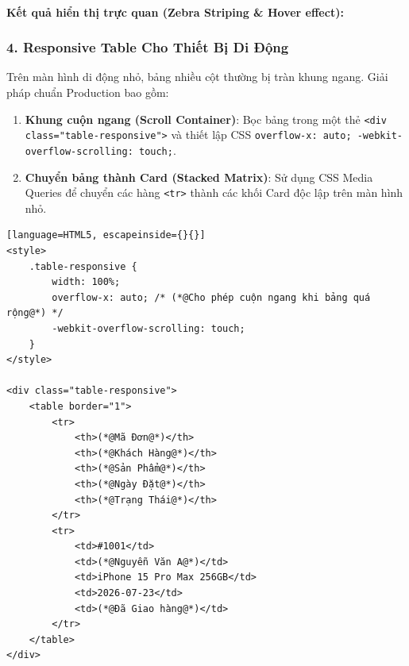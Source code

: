 \documentclass[11pt,oneside]{book}
\newcommand{\thd}[1]{\textcolor{white}{\textbf{\strut #1}}}
\newcommand{\codeinline}[1]{\textcolor{accentOrange}{\texttt{#1}}}
\begin{document}
\paragraph{\textbf{Kết quả hiển thị trực quan (Zebra Striping \& Hover effect):}}
\begin{prettyTableBox}
\end{prettyTableBox}

\subsubsection{4. Responsive Table Cho Thiết Bị Di Động}

Trên màn hình di động nhỏ, bảng nhiều cột thường bị tràn khung ngang. Giải pháp chuẩn Production bao gồm:

\begin{enumerate}[leftmargin=1.5em, itemsep=3pt, parsep=0pt]
    \item \textbf{Khung cuộn ngang (Scroll Container)}: Bọc bảng trong một thẻ \codeinline{<div class="table-responsive">} và thiết lập CSS \codeinline{overflow-x: auto; -webkit-overflow-scrolling: touch;}.
    \item \textbf{Chuyển bảng thành Card (Stacked Matrix)}: Sử dụng CSS Media Queries để chuyển các hàng \codeinline{<tr>} thành các khối Card độc lập trên màn hình nhỏ.
\end{enumerate}

\begin{codeWindow}
\begin{lstlisting}[language=HTML5, escapeinside={}{}]
<style>
    .table-responsive {
        width: 100%;
        overflow-x: auto; /* (*@Cho phép cuộn ngang khi bảng quá rộng@*) */
        -webkit-overflow-scrolling: touch;
    }
</style>

<div class="table-responsive">
    <table border="1">
        <tr>
            <th>(*@Mã Đơn@*)</th>
            <th>(*@Khách Hàng@*)</th>
            <th>(*@Sản Phẩm@*)</th>
            <th>(*@Ngày Đặt@*)</th>
            <th>(*@Trạng Thái@*)</th>
        </tr>
        <tr>
            <td>#1001</td>
            <td>(*@Nguyễn Văn A@*)</td>
            <td>iPhone 15 Pro Max 256GB</td>
            <td>2026-07-23</td>
            <td>(*@Đã Giao hàng@*)</td>
        </tr>
    </table>
</div>
\end{lstlisting}
\end{codeWindow}
\end{document}
